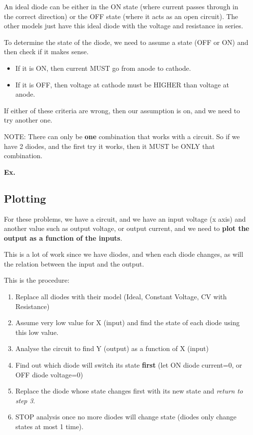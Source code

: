 \documentclass[12pt,letterpaper]{article} \usepackage{amsmath} \usepackage{graphicx} \usepackage[margin=1in]{geometry} \usepackage{longtable}  \usepackage{amssymb}
\begin{document}
	An ideal diode can be either in the ON state (where current passes through in the correct direction) or the OFF state (where it acts as an open circuit). The other models just have this ideal diode with the voltage and resistance in series. 
	
	To determine the state of the diode, we need to assume a state (OFF or ON) and then check if it makes sense.
	\begin{itemize}[]
		\item If it is ON, then current MUST go from anode to cathode.
		\item If it is OFF, then voltage at cathode must be HIGHER than voltage at anode. 
	\end{itemize}

	If either of these criteria are wrong, then our assumption is on, and we need to try another one. 
	
	NOTE: There can only be \textbf{one } combination that works with a circuit. So if we have 2 diodes, and the first try it works, then it MUST be ONLY that combination.
	
	\begin{mdframed}[]
		\textbf{Ex. }
	\end{mdframed}
	
	\subsection{Plotting}
	For these problems, we have a circuit, and we have an input voltage (x axis) and another value such as output voltage, or output current, and we need to \textbf{plot the output as a function of the inputs}. 
	
	This is a lot of work since we have diodes, and when each diode changes, as will the relation between the input and the output. 
	
	This is the procedure: 
	\begin{enumerate}[noitemsep]
		\item Replace all diodes with their model (Ideal, Constant Voltage, CV with Resistance)
		\item Assume very low value for X (input) and find the state of each diode using this low value.
		\item Analyse the circuit to find Y (output) as a function of X (input)
		\item Find out which diode will switch its state \textbf{first }(let ON diode current=0, or OFF diode voltage=0)
		\item Replace the diode whose state changes first with its new state and \textit{return to step 3}. 
		\item STOP analysis once no more diodes will change state (diodes only change states at most 1 time).
	\end{enumerate}
\end{document}
